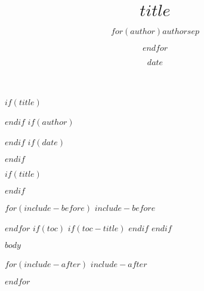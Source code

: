 \documentclass[12pt,a4paper]{article}
\begin{document}
$if(title)$
\title{$title$}
$endif$
$if(author)$
\author{$for(author)$$author$$sep$ \and $endfor$}
$endif$
$if(date)$
\date{$date$}
$endif$

$if(title)$
\maketitle
$endif$

$for(include-before)$
$include-before$

$endfor$
$if(toc)$
$if(toc-title)$
\renewcommand*\contentsname{$toc-title$}
$endif$
\tableofcontents
$endif$

$body$

$for(include-after)$
$include-after$

$endfor$
\end{document}
